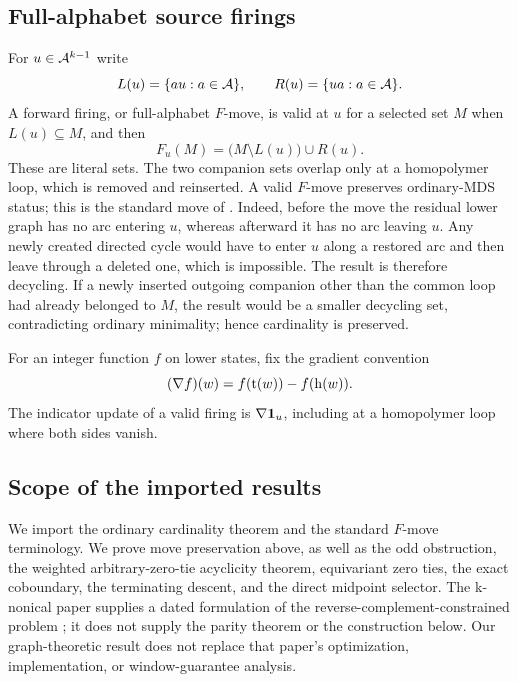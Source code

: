 \subsection{Full-alphabet source firings}

For $u\in\mathcal A^{k-1}$ write
\[
  L(u)=\{au:a\in\mathcal A\},\qquad R(u)=\{ua:a\in\mathcal A\}.
\]
A forward firing, or full-alphabet $F$-move, is valid at $u$ for a selected
set $M$ when $L(u)\subseteq M$, and then
\[
  F_u(M)=\bigl(M\setminus L(u)\bigr)\cup R(u).
\]
These are literal sets.  The two companion sets overlap only at a
homopolymer loop, which is removed and reinserted.  A valid $F$-move
preserves ordinary-MDS status; this is the standard move of
\cite[Section~4.1]{MarcaisDeBlasioKingsford2024}.  Indeed, before the move
the residual lower graph has no arc entering $u$, whereas afterward it has
no arc leaving $u$.  Any newly created directed cycle would have to enter
$u$ along a restored arc and then leave through a deleted one, which is
impossible.  The result is therefore decycling.  If a newly inserted
outgoing companion other than the common loop had already belonged to
$M$, the result would be a smaller decycling set, contradicting ordinary
minimality; hence cardinality is preserved.

For an integer function $f$ on lower states, fix the gradient convention
\begin{equation}
  (\nabla f)(w)=f(\operatorname{t}(w))-f(\operatorname{h}(w)).
  \label{eq:gradient}
\end{equation}
The indicator update of a valid firing is $\nabla\mathbf 1_u$, including at a
homopolymer loop where both sides vanish.

\subsection{Scope of the imported results}

We import the ordinary cardinality theorem and the standard $F$-move
terminology.  We prove move preservation above, as well as the odd
obstruction, the weighted arbitrary-zero-tie acyclicity
theorem, equivariant zero ties, the exact coboundary, the terminating descent,
and the direct midpoint selector.  The k-nonical paper supplies a dated
formulation of the reverse-complement-constrained problem
\cite{MarcaisElderKingsford2024}; it does not supply the parity theorem or
the construction below.  Our graph-theoretic result does not replace that
paper's optimization, implementation, or window-guarantee analysis.
